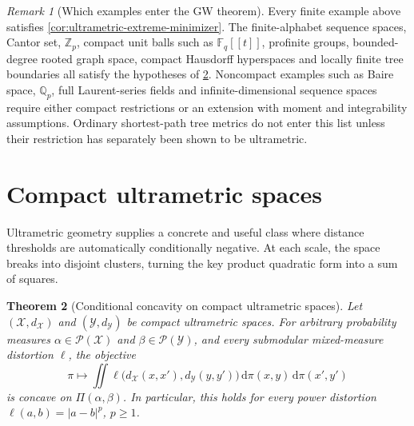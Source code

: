 \documentclass[11pt,a4paper]{article}
\newtheorem{theorem}{Theorem}[section]
\theoremstyle{definition}
\theoremstyle{remark}
\newtheorem{remark}[theorem]{Remark}
\newcommand{\Pcal}{\mathcal P}
\newcommand{\Piopt}{\Pi}
\newcommand{\dd}{\,\mathrm d}
\newcommand{\abs}[1]{\left\lvert #1\right\rvert}
\begin{document}
\begin{remark}[Which examples enter the GW theorem]
Every finite example above satisfies \cref{cor:ultrametric-extreme-minimizer}.
The finite-alphabet sequence spaces, Cantor set, \(\mathbb Z_p\), compact
unit balls such as \(\mathbb F_q[[t]]\), profinite groups, bounded-degree
rooted graph space, compact Hausdorff hyperspaces and locally finite tree
boundaries all satisfy the hypotheses of \cref{thm:ultrametric-concavity}.
Noncompact examples such as Baire space, \(\mathbb Q_p\), full Laurent-series
fields and infinite-dimensional sequence spaces require either compact
restrictions or an extension with moment and integrability assumptions.
Ordinary shortest-path tree metrics do not enter this list unless their
restriction has separately been shown to be ultrametric.
\end{remark}

\section{Compact ultrametric spaces}
\label{sec:ultrametric}

Ultrametric geometry supplies a concrete and useful class where distance
thresholds are automatically conditionally negative.  At each scale, the
space breaks into disjoint clusters, turning the key product quadratic form
into a sum of squares.

\begin{theorem}[Conditional concavity on compact ultrametric spaces]
\label{thm:ultrametric-concavity}
Let \((\mathcal X,d_{\mathcal X})\) and
\((\mathcal Y,d_{\mathcal Y})\) be compact ultrametric spaces.  For arbitrary
probability measures \(\alpha\in\Pcal(\mathcal X)\) and
\(\beta\in\Pcal(\mathcal Y)\), and every submodular mixed-measure distortion
\(\ell\), the objective
\[
  \pi\longmapsto
  \iint
  \ell\bigl(d_{\mathcal X}(x,x'),d_{\mathcal Y}(y,y')\bigr)
  \dd\pi(x,y)\dd\pi(x',y')
\]
is concave on \(\Piopt(\alpha,\beta)\).  In particular, this holds for every
power distortion \(\ell(a,b)=\abs{a-b}^p\), \(p\geq1\).
\end{theorem}
\end{document}
